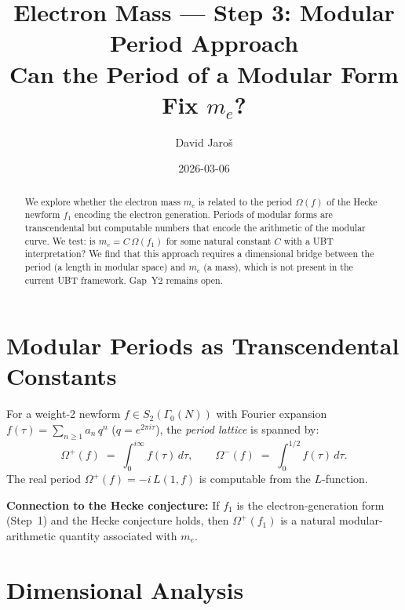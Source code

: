 \documentclass[12pt,a4paper]{article}
\title{\textbf{Electron Mass --- Step 3: Modular Period Approach}\\
         \large Can the Period of a Modular Form Fix $m_e$?}
\author{David Jaro\v{s}}
\date{2026-03-06}
\theoremstyle{definition}
\theoremstyle{remark}
\begin{document}
  \maketitle

  \begin{abstract}
  We explore whether the electron mass $m_e$ is related to the period
  $\Omega(f)$ of the Hecke newform $f_1$ encoding the electron generation.
  Periods of modular forms are transcendental but computable numbers that
  encode the arithmetic of the modular curve.  We test: is
  $m_e = C\,\Omega(f_1)$ for some natural constant $C$ with a UBT
  interpretation?  We find that this approach requires a dimensional
  bridge between the period (a length in modular space) and $m_e$
  (a mass), which is not present in the current UBT framework.
  Gap~Y2 remains open.
  \end{abstract}
\fi

\section{Modular Periods as Transcendental Constants}
\label{sec:periods}

For a weight-2 newform $f \in S_2(\Gamma_0(N))$ with Fourier expansion
$f(\tau) = \sum_{n\geq 1} a_n\,q^n$ ($q = e^{2\pi i\tau}$), the
\emph{period lattice} is spanned by:
\begin{equation}
  \Omega^+(f) \;=\; \int_0^{i\infty} f(\tau)\,d\tau, \qquad
  \Omega^-(f) \;=\; \int_0^{1/2} f(\tau)\,d\tau.
\end{equation}
The real period $\Omega^+(f) = -i\,L(1,f)$ is computable from the
$L$-function.

\begin{insightbox}
\textbf{Connection to the Hecke conjecture:}
If $f_1$ is the electron-generation form (Step~1) and the Hecke
conjecture holds, then $\Omega^+(f_1)$ is a natural modular-arithmetic
quantity associated with $m_e$.
\end{insightbox}

\section{Dimensional Analysis}
\label{sec:dimensional}
\end{document}

